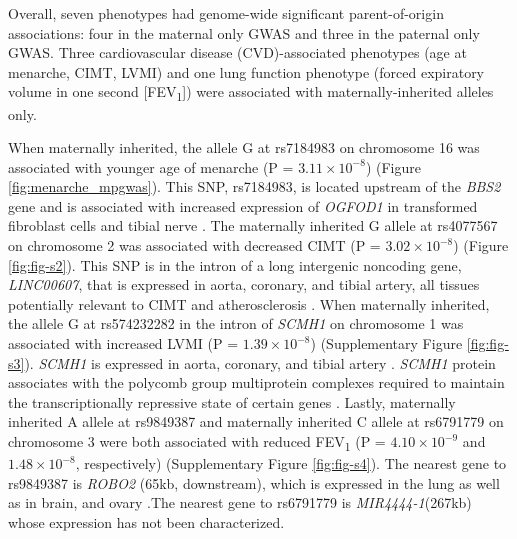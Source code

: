Overall, seven phenotypes had genome-wide significant parent-of-origin associations: four in the maternal only GWAS and three in the paternal only GWAS. Three cardiovascular disease (CVD)-associated phenotypes (age at menarche, CIMT, LVMI) and one lung function phenotype (forced expiratory volume in one second [FEV\textsubscript{1}]) were associated with maternally-inherited alleles only. 

When maternally inherited, the allele G at rs7184983 on chromosome 16 was associated with younger age of menarche (P = $ 3.11 \times 10^{-8}$) (Figure \ref{fig:menarche_mpgwas}). This SNP, rs7184983, is located upstream of the \emph{BBS2} gene and is associated with increased expression of \emph{OGFOD1} in transformed fibroblast cells and tibial nerve \cite{Consortium2015}. The maternally inherited G allele at rs4077567 on chromosome 2 was associated with decreased CIMT (P = $ 3.02 \times 10^{-8}$) (Figure \ref{fig:fig-s2}). This SNP is in the intron of a long intergenic noncoding gene, \emph{LINC00607}, that  is expressed in aorta, coronary, and tibial artery, all tissues potentially relevant to CIMT and atherosclerosis \cite{Consortium2015}. When maternally inherited, the allele G at rs574232282  in the intron of \emph{SCMH1} on chromosome 1 was associated with increased LVMI (P = $ 1.39 \times 10^{-8}$) (Supplementary Figure \ref{fig:fig-s3}). \emph{SCMH1} is expressed in aorta, coronary, and tibial artery \cite{Consortium2015}. \emph{SCMH1} protein associates with the polycomb group multiprotein complexes required to maintain the transcriptionally repressive state of certain genes \cite{Consortium2015}. Lastly, maternally inherited A allele at rs9849387 and maternally inherited C allele at rs6791779 on chromosome 3 were both associated with reduced FEV\textsubscript{1} (P = $ 4.10 \times 10^{-9}$ and $1.48 \times 10^{-8}$, respectively) (Supplementary Figure \ref{fig:fig-s4}). The nearest gene to rs9849387 is \emph{ROBO2} (65kb, downstream), which is expressed in the lung as well as in brain, and ovary \cite{Consortium2015}.The nearest gene to rs6791779 is \emph{MIR4444-1}(267kb) whose expression has not been characterized.

